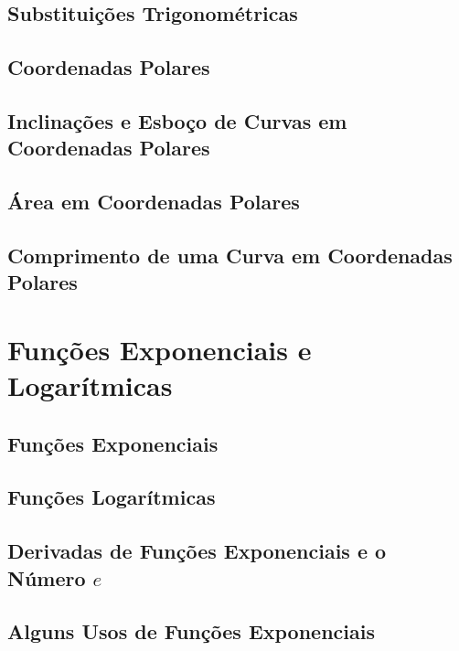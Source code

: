 \documentclass{svmono}
\begin{document}
\section{Substituições Trigonométricas}
\label{sec:trigsubst}

\section{Coordenadas Polares}
\label{sec:polarcoord}

\section{Inclinações e Esboço de Curvas em Coordenadas Polares}
\label{sec:polarsketch}

\section{Área em Coordenadas Polares}
\label{sec:polararea}

\section{Comprimento de uma Curva em Coordenadas Polares}
\label{sec:polarlength}

\chapterproblems

\chapter{Funções Exponenciais e Logarítmicas}
\label{chp:explog}

\section{Funções Exponenciais}
\label{sec:expfunc}

\section{Funções Logarítmicas}
\label{sec:logfunc}

\section{Derivadas de Funções Exponenciais e o Número $e$}
\label{sec:derivexp}

\section{Alguns Usos de Funções Exponenciais}
\label{sec:useexp}
\end{document}
